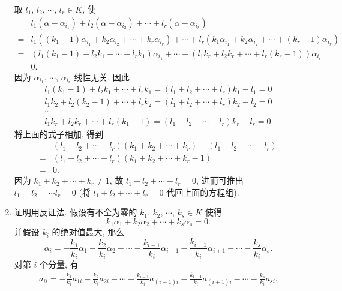 \begin{enumerate}
        取 $l_1$, $l_2$, $\cdots$, $l_r \in K$, 使
        \begin{align*}
            & l_1(\alpha - \alpha_{i_1}) + l_2(\alpha - \alpha_{i_2}) + \cdots + l_r(\alpha - \alpha_{i_r}) \\
            ={} & l_1((k_1 - 1)\alpha_{i_1} + k_2\alpha_{i_2} + \cdots + k_r\alpha_{i_r}) + \cdots + l_r(k_1\alpha_{i_1} + k_2\alpha_{i_2} + \cdots + (k_r - 1)\alpha_{i_r}) \\
            ={} & (l_1(k_1 - 1) + l_2k_1 + \cdots + l_rk_1)\alpha_{i_1} + \cdots + (l_1k_r + l_2k_r + \cdots + l_r(k_r-1))\alpha_{i_r} \\
            ={} & 0.
        \end{align*}
        因为 $\alpha_{i_1}$, $\cdots$, $\alpha_{i_r}$ 线性无关, 因此
        \begin{gather*}
            l_1(k_1 - 1) + l_2k_1 + \cdots + l_rk_1 = (l_1 + l_2 + \cdots + l_r)k_1 - l_1 = 0 \\
            l_1k_2 + l_2(k_2-1) + \cdots + l_rk_2 = (l_1 + l_2 + \cdots + l_r)k_2 - l_2 = 0 \\
            \cdots \\
            l_1k_r + l_2k_r + \cdots + l_r(k_1-1) = (l_1 + l_2 + \cdots + l_r)k_r - l_r = 0
        \end{gather*}
        将上面的式子相加, 得到
        \begin{align*}
            & (l_1 + l_2 + \cdots + l_r)(k_1 + k_2 + \cdots + k_r) - (l_1 + l_2 + \cdots + l_r) \\
            ={} &  (l_1 + l_2 + \cdots + l_r)(k_1 + k_2 + \cdots + k_r - 1) \\
            ={} & 0.
        \end{align*}
        因为 $k_1 + k_2 + \cdots + k_r \neq 1$, 故 $l_1 + l_2 + \cdots + l_r = 0$, 进而可推出 $l_1 = l_2 = \cdots l_r = 0$ (将 $l_1 + l_2 + \cdots + l_r = 0$ 代回上面的方程组).
    \item %
        {\heiti 证明}\quad 用反证法. 假设有不全为零的 $k_1$, $k_2$, $\cdots$, $k_s \in K$ 使得
        \[
            k_1\alpha_1 + k_2\alpha_2 + \cdots + k_s\alpha_s = 0.
        \]
        并假设 $k_i$ 的绝对值最大, 那么
        \[
            \alpha_i = -\frac{k_1}{k_i}\alpha_1 - \frac{k_2}{k_i}\alpha_2 - \cdots - \frac{k_{i-1}}{k_i}\alpha_{i-1} - \frac{k_{i+1}}{k_i}\alpha_{i+1} - \cdots - \frac{k_s}{k_i}\alpha_s.
        \]
        对第 $i$ 个分量, 有
        \begin{align*}
            a_{ii} = -\frac{k_1}{k_i}a_{1i} - \frac{k_2}{k_i}a_{2i} - \cdots - \frac{k_{i-1}}{k_i}a_{(i-1)i} - \frac{k_{i+1}}{k_i}a_{(i+1)i} - \cdots - \frac{k_s}{k_i}a_{si}.

\end{align*}
\end{enumerate}
